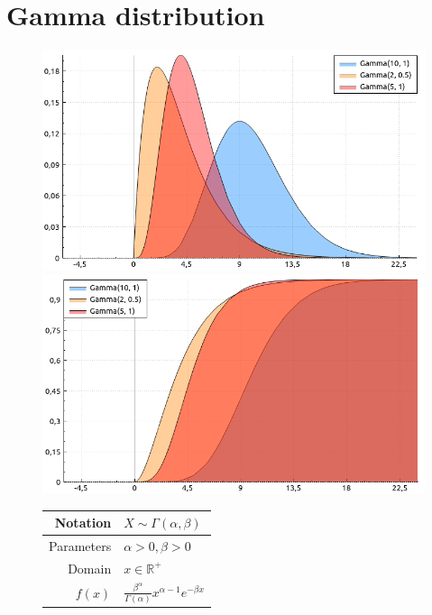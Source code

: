 \documentclass[a4paper,11pt]{article}
\theoremstyle{plain}
\theoremstyle{definition}
\newcommand{\MR}{\mathbb{R}}
\begin{document}
		
	\pagebreak
	\section{Gamma distribution}
	\begin{figure}[!htb]\centering
		\begin{minipage}{0.55\textwidth}
			\includegraphics[width=\linewidth, right]{gamma_pdf}
			\captionsetup{labelformat=empty}
			\includegraphics[width=\linewidth, right]{gamma_cdf}
			\captionsetup{labelformat=empty}
		\end{minipage}
		\begin{minipage}{0.4\textwidth}
			\begin{tabular}{| r | l |}
				\hline
				Notation & $X \sim \Gamma(\alpha, \beta)$ \\
				\hline
				Parameters & $\alpha > 0, \beta > 0$ \\
				\hline
				Domain & $x \in \MR^+$  \\
				\hline
				$f(x)$ & $\frac{\beta^\alpha}{\Gamma(\alpha)} x^{\alpha-1}e^{-\beta x}  $ \\

\end{tabular}
\end{minipage}
\end{figure}
\end{document}
